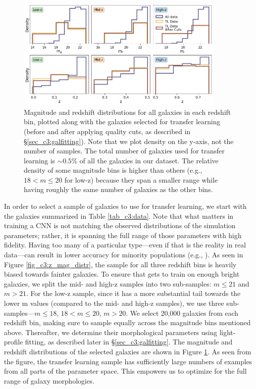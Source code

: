 \begin{figure}[htb]
    \centering
    \includegraphics[width = 0.9\textwidth]{tl_para_dist.png}
    \caption{Magnitude and redshift distributions for all galaxies in each redshift bin, plotted along with the galaxies selected for transfer learning (before and after applying quality cuts, as described in \S \ref{sec_c3:galfitting}). Note that we plot density on the y-axis, not the number of samples. The total number of galaxies used for transfer learning is $\sim0.5\%$ of all the galaxies in our dataset. The relative density of some magnitude bins is higher than others (e.g., $18 < m \leq 20$ for low-z) because they span a smaller range while having roughly the same number of galaxies as the other bins.}
    \label{fig_c3:tl_para_dist}
\end{figure}

In order to select a sample of galaxies to use for transfer learning, we start with the galaxies summarized in Table \ref{tab_c3:data}. Note that what matters in training a CNN is not matching the observed distributions of the simulation parameters; rather, it is spanning the full range of those parameters with high fidelity. Having too many of a particular type---even if that is the reality in real data---can result in lower accuracy for minority populations (e.g., \citealp{gamornet_paper}). As seen in Figure \ref{fig_c3:z_mag_distr}, the sample for all three redshift bins is heavily biased towards fainter galaxies. To ensure that \gampen{} gets to train on enough bright galaxies, we split the mid- and high-z samples into two sub-samples: $m \leq 21$ and $m > 21$. For the low-z sample, since it has a more substantial tail towards the lower m values (compared to the mid- and high-z samples), we use  three sub-samples---$m \leq 18$, $18 < m \leq 20$, $m > 20$. We select 20,000 galaxies from each redshift bin, making sure to sample equally across the magnitude bins mentioned above. Thereafter, we determine their morphological parameters using light-profile fitting, as described later in \S \ref{sec_c3:galfitting}. The magnitude and redshift distributions of the selected galaxies are shown in Figure \ref{fig_c3:tl_para_dist}. As seen from the figure, the transfer learning sample has sufficiently large numbers of examples from all parts of the parameter space. This empowers us to optimize \gampen{} for the full range of galaxy morphologies.

